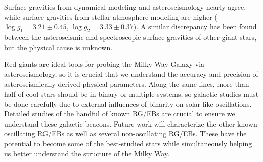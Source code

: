 Surface gravities from dynamical modeling and asteroseismology nearly agree, while surface gravities from stellar atmosphere modeling are higher ($\log g_1 = 3.21 \pm 0.45$, $\log g_2 = 3.33 \pm 0.37$). A similar discrepancy has been found between the asteroseismic and spectroscopic surface gravities of other giant stars, but the physical cause is unknown. 

Red giants are ideal tools for probing the Milky Way Galaxy via asteroseismology, so it is crucial that we understand the accuracy and precision of asteroseismically-derived physical parameters. Along the same lines, more than half of cool stars should be in binary or multiple systems, so galactic studies must be done carefully due to external influences of binarity on solar-like oscillations. Detailed studies of the handful of known RG/EBs are crucial to ensure we understand these galactic beacons. Future work will characterize the other known oscillating RG/EBs as well as several non-oscillating RG/EBs. These have the potential to become some of the best-studied stars while simultaneously helping us better understand the structure of the Milky Way.
